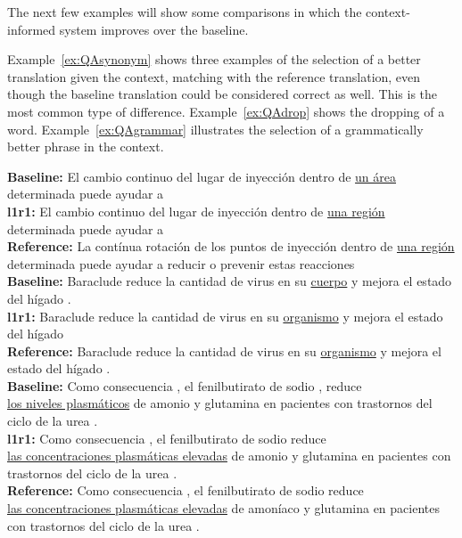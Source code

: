 The next few examples will show some comparisons in which the context-informed
system improves over the baseline.

Example~\ref{ex:QAsynonym} shows three examples of the selection of a better
translation given the context, matching with the reference translation, even
though the baseline translation could be considered correct as well. This is
the most common type of difference. Example~\ref{ex:QAdrop} shows the dropping
of a word. Example~\ref{ex:QAgrammar} illustrates the selection of a grammatically better
phrase in the context.


\begin{exe}
\footnotesize
\ex \textbf{Baseline:} El cambio continuo del lugar de inyección dentro de \underline{un área} determinada puede ayudar a \\
\textbf{l1r1:} El cambio continuo del lugar de inyección dentro de \underline{una región} determinada puede ayudar a \\
\textbf{Reference:} La contínua rotación de los puntos de inyección dentro de \underline{una región} determinada puede ayudar a reducir o prevenir estas reacciones \\
\noindent\makebox[\linewidth]{\rule{\linewidth}{0.4pt}}
\textbf{Baseline:} Baraclude reduce la cantidad de virus en su \underline{cuerpo} y mejora el estado del hígado . \\
\textbf{l1r1:} Baraclude reduce la cantidad de virus en su \underline{organismo} y mejora el estado del hígado  \\
\textbf{Reference:} Baraclude reduce la cantidad de virus en su \underline{organismo} y mejora el estado del hígado .
\\
\noindent\makebox[\linewidth]{\rule{\linewidth}{0.4pt}}
\textbf{Baseline:} Como consecuencia , el fenilbutirato de sodio , reduce \\  \underline{los niveles plasmáticos} de amonio y glutamina en pacientes con trastornos del ciclo de la urea . \\
\textbf{l1r1:} Como consecuencia , el fenilbutirato de sodio reduce \\ \underline{las concentraciones plasmáticas elevadas} de amonio y glutamina en pacientes con trastornos del ciclo de la urea .  \\
\textbf{Reference:} Como consecuencia , el fenilbutirato de sodio reduce \\ \underline{las concentraciones plasmáticas elevadas} de amoníaco y glutamina en pacientes con trastornos del ciclo de la urea .
\label{ex:QAsynonym}
\end{exe}

